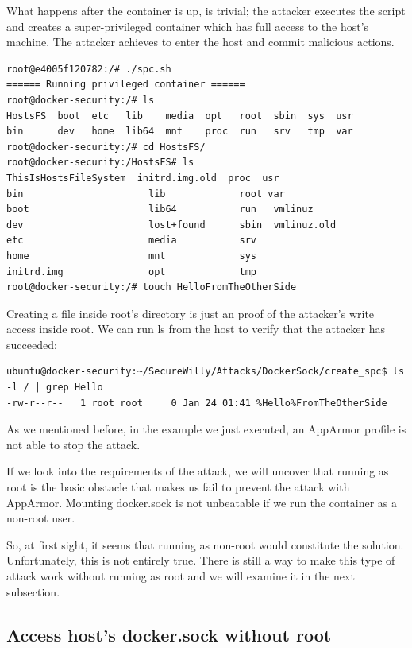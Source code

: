What happens after the container is up, is trivial; the attacker executes the script and creates a super-privileged container which has full access to the host's machine. The attacker achieves to enter the host and commit malicious actions.

\begin{lstlisting}[style=terminal]
root@e4005f120782:/# ./spc.sh
====== Running privileged container ======
root@docker-security:/# ls
HostsFS  boot  etc   lib    media  opt   root  sbin  sys  usr
bin      dev   home  lib64  mnt    proc  run   srv   tmp  var
root@docker-security:/# cd HostsFS/
root@docker-security:/HostsFS# ls
ThisIsHostsFileSystem  initrd.img.old  proc  usr
bin                      lib             root var
boot                     lib64           run   vmlinuz
dev                      lost+found      sbin  vmlinuz.old
etc                      media           srv
home                     mnt             sys
initrd.img               opt             tmp
root@docker-security:/# touch HelloFromTheOtherSide
\end{lstlisting}

Creating a file inside root's directory is just an  proof of the attacker's write access inside root. We can run ls from the host to verify that the attacker has succeeded:

\begin{lstlisting}[style=terminal]
ubuntu@docker-security:~/SecureWilly/Attacks/DockerSock/create_spc$ ls -l / | grep Hello
-rw-r--r--   1 root root     0 Jan 24 01:41 %Hello%FromTheOtherSide
\end{lstlisting}

As we mentioned before, in the example we just executed, an AppArmor profile is not able to stop the attack. 

If we look into the requirements of the attack, we will uncover that running as root is the basic obstacle that makes us fail to prevent the attack with AppArmor. Mounting docker.sock is not unbeatable if we run the container as a non-root user.

So, at first sight, it seems that running as non-root would constitute the solution. Unfortunately, this is not entirely true. There is still a way to make this type of attack work without running as root and we will examine it in the next subsection.

\subsection{Access host's docker.sock without root}
